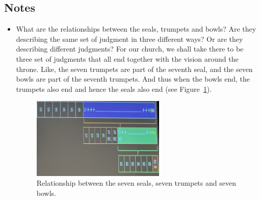\subsection*{Notes}
\begin{itemize}
  \item{What are the relationships between the seals, trumpets and bowls?
  Are they describing the same set of judgment in three different ways?  Or
  are they describing different judgments?  For our church, we shall take
  there to be three set of judgments that all end together with the vision
  around the throne.  Like, the seven trumpets are part of the seventh seal,
  and the seven bowls are part of the seventh trumpets.  And thus when the
  bowls end, the trumpets also end and hence the seals also end (see Figure~\ref{fig: r/s between seals, trumpets and bowls}). 
  
  \begin{figure}[H]
    \centering
    \includegraphics[width=0.6\textwidth, trim={0cm 0cm 0cm 0cm},clip]{Figures/februarySermon4Fig1}
    \caption[]{Relationship between the seven seals, seven trumpets and seven bowls.}
    \label{fig: r/s between seals, trumpets and bowls}
  \end{figure}
  
  }


\end{itemize}
